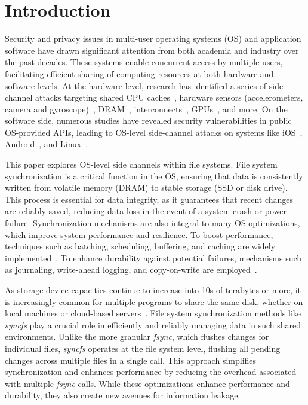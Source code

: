\section{Introduction}
\label{sec:intro}

Security and privacy issues in multi-user operating systems (OS) and application software have drawn significant attention from both academia and industry over the past decades. These systems enable concurrent access by multiple users, facilitating efficient sharing of computing resources at both hardware and software levels. At the hardware level, research has identified a series of side-channel attacks targeting shared CPU caches~\cite{rauscher2024idleleak, wang2019papp, liu2015last}, hardware sensors (\eg accelerometers, camera and gyroscope)~\cite{slocum2023going, templeman2012placeraider, gao2022inertiear}, DRAM~\cite{pessl2016drama,van2023dramaqueen}, interconnects~\cite{tan2021invisible,zhang2024beyond}, GPUs~\cite{naghibijouybari2018rendered,wei2020leaky}, and more. On the software side, numerous studies have revealed security vulnerabilities in public OS-provided APIs, leading to OS-level side-channel attacks on systems like iOS~\cite{zhang2018level, wang2023danger}, Android~\cite{diao2016no, zhang2023s}, and Linux~\cite{chen2023sync+, jiang2024sync+}. 

This paper explores OS-level side channels within file systems. File system synchronization is a critical function in the OS, ensuring that data is consistently written from volatile memory (\eg DRAM) to stable storage (\eg SSD or disk drive). This process is essential for data integrity, as it guarantees that recent changes are reliably saved, reducing data loss in the event of a system crash or power failure. Synchronization mechanisms are also integral to many OS optimizations, which improve system performance and resilience. To boost performance, techniques such as batching, scheduling, buffering, and caching are widely implemented~\cite{arpaci2018operating,mogul1994better,seltzer1990disk,silvers2000ubc}. To enhance durability against potential failures, mechanisms such as journaling, write-ahead logging, and copy-on-write are employed~\cite{chidambaram2013optimistic,chidambaram2012consistency,ganger1994metadata,hagmann1987reimplementing}.


As storage device capacities continue to increase into 10s of terabytes or more, it is increasingly common for multiple programs to share the same disk, whether on local machines or cloud-based servers~\cite{gao2019houdini, wang2012disk, bessani2014scfs}. File system synchronization methods like \textit{syncfs} play a crucial role in efficiently and reliably managing data in such shared environments. Unlike the more granular \textit{fsync}, which flushes changes for individual files, \textit{syncfs} operates at the file system level, flushing all pending changes across multiple files in a single call. This approach simplifies synchronization and enhances performance by reducing the overhead associated with multiple \textit{fsync} calls. While these optimizations enhance performance and durability, they also create new avenues for information leakage. 

